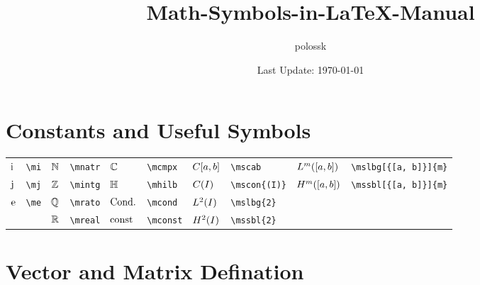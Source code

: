 \documentclass{article}
\title{Math-Symbols-in-\LaTeX{}-Manual}
\author{polossk}
\date{Last Update: \today}
\begin{document}
\maketitle
\tableofcontents
\thispagestyle{fancy}
\renewcommand{\baselinestretch}{1.25}
\sWuhao\fSong
\section{Constants and Useful Symbols}
\begin{longtable}{*{10}{l}}
$\mi$ & \lstinline`\mi` & $\mnatr$ & \lstinline`\mnatr` & $\mcmpx$ & \lstinline`\mcmpx` & $\mscab$ & \lstinline`\mscab` & $\mslbg[{[a, b]}]{m}$ & \lstinline`\mslbg[{[a, b]}]{m}`\\
$\mj$ & \lstinline`\mj` & $\mintg$ & \lstinline`\mintg` & $\mhilb$ & \lstinline`\mhilb` & $\mscon{(I)}$ & \lstinline`\mscon{(I)}` & $\mssbl[{[a, b]}]{m}$ & \lstinline`\mssbl[{[a, b]}]{m}`\\
$\me$ & \lstinline`\me` & $\mrato$ & \lstinline`\mrato` & $\mcond$ & \lstinline`\mcond` & $\mslbg{2}$ & \lstinline`\mslbg{2}` & \\
 &  & $\mreal$ & \lstinline`\mreal` & $\mconst$ & \lstinline`\mconst` & $\mssbl{2}$ & \lstinline`\mssbl{2}` & \\
\end{longtable}

\section{Vector and Matrix Defination}
\end{document}
